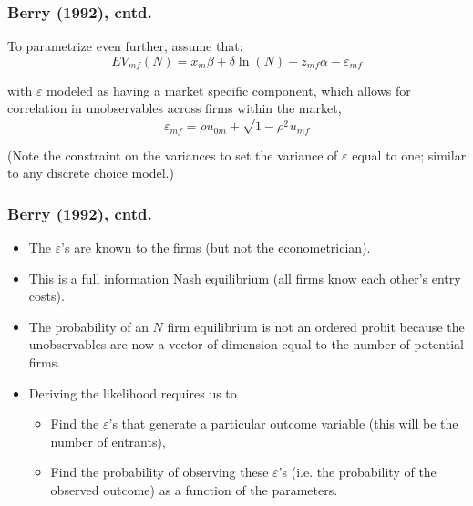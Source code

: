 \begin{frame}%

\frametitle{Berry (1992), cntd.}

To parametrize even further, assume that:\ \ 
\begin{equation}
EV_{mf}(N)=x_{m}\beta +\delta \ln (N)-z_{mf}\alpha -\varepsilon _{mf}
\label{entry6}
\end{equation}

with $\varepsilon $ modeled as having a market specific component, which
allows for correlation in unobservables across firms within the market, 
\begin{equation*}
\varepsilon _{mf}=\rho u_{0m}+\sqrt{1-\rho ^{2}}u_{mf}
\end{equation*}

(Note the constraint on the variances to set the variance of $\varepsilon $
equal to one; similar to any discrete choice model.)

\end{frame}%

\begin{frame}%

\frametitle{Berry (1992), cntd.}

\begin{itemize}
\item The $\varepsilon $'s are known to the firms (but not the
econometrician).

\item This is a full information Nash equilibrium (all firms know each
other's entry costs).

\item The probability of an $N$ firm equilibrium is not an ordered probit
because the unobservables are now a vector of dimension equal to the number
of potential firms.

\item Deriving the likelihood requires us to

\begin{itemize}
\item Find the $\varepsilon $'s that generate a particular outcome variable
(this will be the number of entrants),

\item Find the probability of observing these $\varepsilon $'s (i.e. the
probability of the observed outcome) as a function of the parameters.
\end{itemize}
\end{itemize}

\end{frame}%

